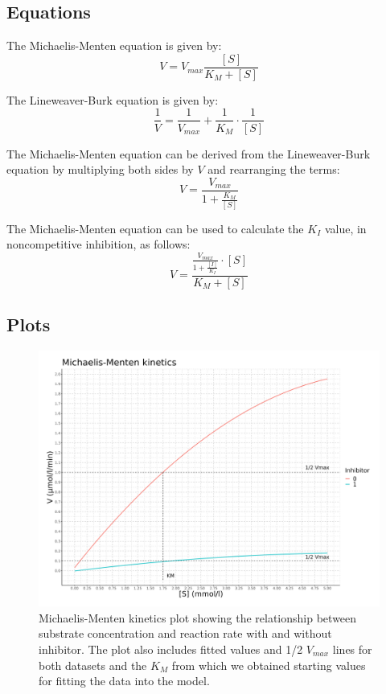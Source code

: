 \documentclass{article}
\begin{document}
\subsection*{Equations}

The Michaelis-Menten equation is given by:
\begin{equation}
    V = V_{max} \frac{[S]}{K_{M} + [S]}
\end{equation}

The Lineweaver-Burk equation is given by:
\begin{equation}
    \frac{1}{V} = \frac{1}{V_{max}} + \frac{1}{K_{M}} \cdot \frac{1}{[S]}
\end{equation}

The Michaelis-Menten equation can be derived from the Lineweaver-Burk equation by
multiplying both sides by $V$ and rearranging the terms:
\begin{equation}
    V = \frac{V_{max}}{\displaystyle 1 + \frac{K_{M}}{[S]}}
\end{equation}

The Michaelis-Menten equation can be used to calculate the $K_I$ value, in noncompetitive
inhibition, as follows: %
\begin{equation}
    V = \frac{\displaystyle \frac{V_{max}}{1 + \frac{[I]}{K_{I}}} \cdot [S]}{K_{M} + [S]}
\end{equation}

\subsection*{Plots}

\begin{figure}[H]
    \centering
    \includegraphics[width=1.0\textwidth, height=0.5\textheight]{plots/data_plot1.png}
    \caption{Michaelis-Menten kinetics plot showing the relationship
        between substrate concentration and reaction rate with and without inhibitor.
        The plot also includes fitted values and 1/2 $V_{max}$ lines for both datasets and
        the $K_{M}$ from which we obtained starting values for fitting the data into the
        model.}
    \label{fig:MMplot}
\end{figure}
\end{document}
